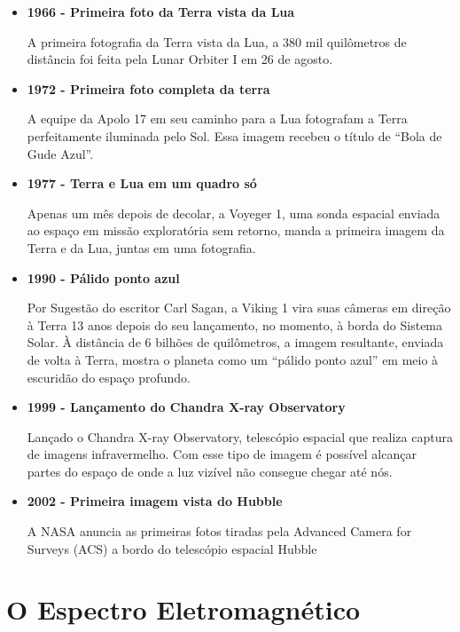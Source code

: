 \documentclass[
	article,			%
	12pt,				%
	oneside,			%
	a4paper,			%
	english,			%
	brazil,				%
	sumario=tradicional
	]{abntex2}
\begin{document}
\begin{itemize}
	\item \textbf{1966 - Primeira foto da Terra vista da Lua}

	A primeira fotografia da Terra vista da Lua, a 380 mil quilômetros de
	distância foi feita pela Lunar Orbiter I em 26 de agosto.
	\cite{fotografia2011ng}

	\item \textbf{1972 - Primeira foto completa da terra}

	A equipe da Apolo 17 em seu caminho para a Lua fotografam a Terra
	perfeitamente iluminada pelo Sol. Essa imagem recebeu o título de ``Bola de
	Gude Azul''. \cite{fotografia2011ng}

	\item \textbf{1977 - Terra e Lua em um quadro só}

	Apenas um mês depois de decolar, a Voyeger 1, uma sonda espacial enviada ao
	espaço em missão exploratória sem retorno, manda a primeira imagem da Terra
	e da Lua, juntas em uma fotografia. \cite{fotografia2011ng}

	\item \textbf{1990 - Pálido ponto azul}

	Por Sugestão do escritor Carl Sagan, a Viking 1 vira suas câmeras em direção
	à Terra 13 anos depois do seu lançamento, no momento, à borda do Sistema
	Solar. À distância de 6 bilhões de quilômetros, a imagem resultante, enviada
	de volta à Terra, mostra o planeta como um ``pálido ponto azul'' em meio à
	escuridão do espaço profundo. \cite{fotografia2011ng}

	\item \textbf{1999 - Lançamento do Chandra X-ray Observatory}

	Lançado o Chandra X-ray Observatory, telescópio espacial que realiza captura
	de imagens infravermelho. Com esse tipo de imagem é possível alcançar partes
	do espaço de onde a luz vizível não consegue chegar até nós.
	\cite{chandraxray}

	\item \textbf{2002 - Primeira imagem vista do Hubble}

	A NASA anuncia as primeiras fotos tiradas pela Advanced Camera for Surveys
	(ACS) a bordo do telescópio espacial Hubble \cite{fotografia2011ng}
\end{itemize} 

\section{O Espectro Eletromagnético}
\end{document}
